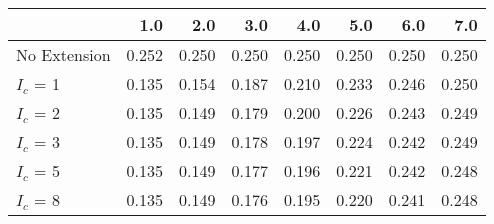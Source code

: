 \begin{tabular}{lrrrrrrr}
\toprule
{} &   1.0 &   2.0 &   3.0 &   4.0 &   5.0 &   6.0 &   7.0 \\
\midrule
No Extension & 0.252 & 0.250 & 0.250 & 0.250 & 0.250 & 0.250 & 0.250 \\
$I_c$ = 1    & 0.135 & 0.154 & 0.187 & 0.210 & 0.233 & 0.246 & 0.250 \\
$I_c$ = 2    & 0.135 & 0.149 & 0.179 & 0.200 & 0.226 & 0.243 & 0.249 \\
$I_c$ = 3    & 0.135 & 0.149 & 0.178 & 0.197 & 0.224 & 0.242 & 0.249 \\
$I_c$ = 5    & 0.135 & 0.149 & 0.177 & 0.196 & 0.221 & 0.242 & 0.248 \\
$I_c$ = 8    & 0.135 & 0.149 & 0.176 & 0.195 & 0.220 & 0.241 & 0.248 \\
\bottomrule
\end{tabular}
